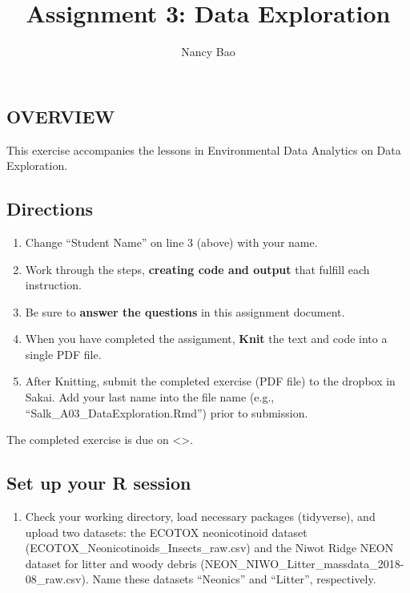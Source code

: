 \documentclass[
]{article}
\title{Assignment 3: Data Exploration}
\author{Nancy Bao}
\date{}
\providecommand{\tightlist}{%
  \setlength{\itemsep}{0pt}\setlength{\parskip}{0pt}}
\begin{document}
\maketitle

\hypertarget{overview}{%
\subsection{OVERVIEW}\label{overview}}

This exercise accompanies the lessons in Environmental Data Analytics on
Data Exploration.

\hypertarget{directions}{%
\subsection{Directions}\label{directions}}

\begin{enumerate}
\def\labelenumi{\arabic{enumi}.}
\tightlist
\item
  Change ``Student Name'' on line 3 (above) with your name.
\item
  Work through the steps, \textbf{creating code and output} that fulfill
  each instruction.
\item
  Be sure to \textbf{answer the questions} in this assignment document.
\item
  When you have completed the assignment, \textbf{Knit} the text and
  code into a single PDF file.
\item
  After Knitting, submit the completed exercise (PDF file) to the
  dropbox in Sakai. Add your last name into the file name (e.g.,
  ``Salk\_A03\_DataExploration.Rmd'') prior to submission.
\end{enumerate}

The completed exercise is due on \textless\textgreater.

\hypertarget{set-up-your-r-session}{%
\subsection{Set up your R session}\label{set-up-your-r-session}}

\begin{enumerate}
\def\labelenumi{\arabic{enumi}.}
\tightlist
\item
  Check your working directory, load necessary packages (tidyverse), and
  upload two datasets: the ECOTOX neonicotinoid dataset
  (ECOTOX\_Neonicotinoids\_Insects\_raw.csv) and the Niwot Ridge NEON
  dataset for litter and woody debris
  (NEON\_NIWO\_Litter\_massdata\_2018-08\_raw.csv). Name these datasets
  ``Neonics'' and ``Litter'', respectively.
\end{enumerate}
\end{document}
